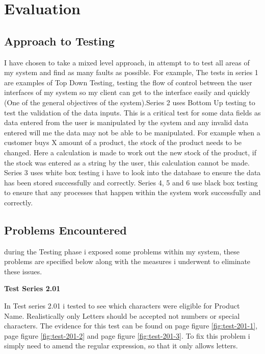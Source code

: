 \section{Evaluation}

\subsection{Approach to Testing}

I have chosen to take a mixed level approach, in attempt to to test all areas of my system and find as many faults as possible. For example,  The tests in series 1 are examples of Top Down Testing, testing the flow of control between the user interfaces of my system so my client can get to the interface easily and quickly (One of the general objectives of the system).Series 2 uses Bottom Up testing to test the validation of the data inputs. This is a critical test for some data fields as data entered from the user is manipulated by the system and any invalid data entered will me the data may not be able to be manipulated. For example when a customer buys X amount of a product, the stock of the product needs to be changed. Here a calculation is made to work out the new stock of the product, if the stock was entered as a string by the user, this calculation cannot be made. Series 3 uses white box testing i have to look into the database to ensure the data has been stored successfully and correctly. Series 4, 5 and 6 use black box testing to ensure that any processes that happen within the system work successfully and correctly.

\subsection{Problems Encountered}

during the Testing phase i exposed some problems within my system, these problems are specified below along with the measures i underwent to eliminate these issues. 

\textbf{Test Series 2.01}

In Test series 2.01 i tested to see which characters were eligible for Product Name. Realistically only Letters should be accepted not numbers or special characters. The evidence for this test can be found on page \pageref{fig:test-201-1} figure \ref{fig:test-201-1}, page \pageref{fig:test-201-2} figure \ref{fig:test-201-2} and  page \pageref{fig:test-201-3} figure \ref{fig:test-201-3}. To fix this problem i simply need to amend the regular expression, so that it only allows letters. 


